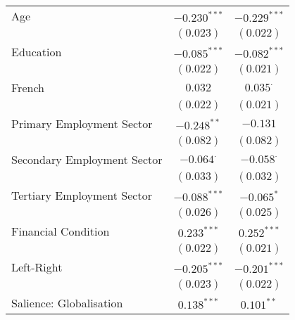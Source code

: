 \begin{center}
\begin{tiny}
\begin{longtable}{l@{} c@{} c@{}}
\quad Age                                                                  & $-0.230^{***}$   & $-0.229^{***}$   \\
                                                                           & $(0.023)$        & $(0.022)$        \\
\quad Education                                                            & $-0.085^{***}$   & $-0.082^{***}$   \\
                                                                           & $(0.022)$        & $(0.021)$        \\
\quad French                                                               & $0.032$          & $0.035^{\cdot}$  \\
                                                                           & $(0.022)$        & $(0.021)$        \\
\quad Primary Employment Sector                                            & $-0.248^{**}$    & $-0.131$         \\
                                                                           & $(0.082)$        & $(0.082)$        \\
\quad Secondary Employment Sector                                          & $-0.064^{\cdot}$ & $-0.058^{\cdot}$ \\
                                                                           & $(0.033)$        & $(0.032)$        \\
\quad Tertiary Employment Sector                                           & $-0.088^{***}$   & $-0.065^{*}$     \\
                                                                           & $(0.026)$        & $(0.025)$        \\
\quad Financial Condition                                                  & $0.233^{***}$    & $0.252^{***}$    \\
                                                                           & $(0.022)$        & $(0.021)$        \\
\quad Left-Right                                                           & $-0.205^{***}$   & $-0.201^{***}$   \\
                                                                           & $(0.023)$        & $(0.022)$        \\
\quad Salience: Globalisation                                              & $0.138^{***}$    & $0.101^{**}$     \\

\end{longtable}
\end{tiny}
\end{center}
